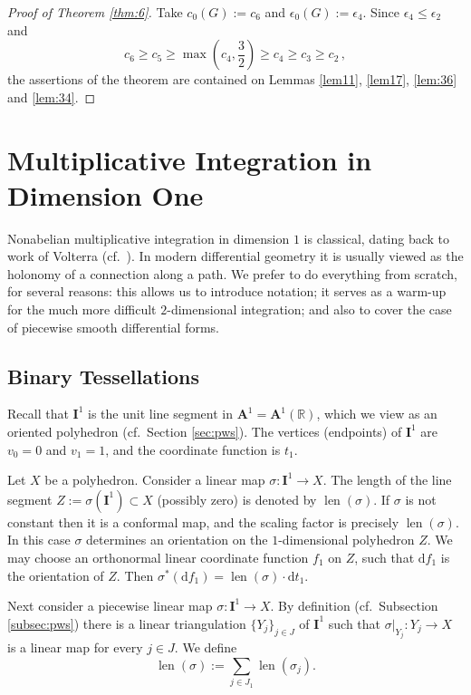 \documentclass[10pt, a4paper]{amsart}
\theoremstyle{definition}
\numberwithin{equation}{section}
\newcommand{\opn}{\operatorname}
\newcommand{\mbf}[1]{\mathbf{#1}}
\newcommand{\mrm}[1]{\mathrm{#1}}
\newcommand{\mbb}[1]{\mathbb{#1}}
\newcommand{\smfrac}[2]{{\textstyle \frac{#1}{#2}}}
\newcommand{\tup}[1]{\textup{#1}}
\newcommand{\R}{\mbb{R}}
\renewcommand{\d}{\mrm{d}}
\begin{document}
\begin{proof}[Proof of Theorem \tup{\ref{thm:6}}]
Take
$c_0(G) := c_6$ and $\epsilon_0(G) := \epsilon_4$.
Since $\epsilon_4 \leq \epsilon_2$ and
\[ c_6 \geq c_5 \geq \max( c_4, \smfrac{3}{2} ) 
\geq c_4 \geq c_3 \geq c_2 \, , \]
the assertions of the theorem 
are contained on Lemmas \ref{lem11}, \ref{lem17}, \ref{lem:36}
and \ref{lem:34}.  
\end{proof}








\cleardoublepage
\section{Multiplicative Integration in Dimension One}
\label{sec:dim1}

Nonabelian multiplicative integration in dimension $1$ is classical, dating back
to work of Volterra (cf.\ \cite{DF}).
In modern differential geometry it is
usually viewed as the holonomy of a connection along a path. We prefer
to do everything from scratch, for several reasons: this allows us to introduce
notation; it serves as a warm-up for the much more difficult
$2$-dimensional integration; and also to cover the case of piecewise smooth
differential forms. 

\subsection{Binary Tessellations}
Recall that $\mbf{I}^1$ is the unit line segment in 
$\mbf{A}^{1} = \mbf{A}^{1}(\R)$, which we view as an oriented
polyhedron (cf.\ Section \ref{sec:pws}). The vertices
(endpoints) of $\mbf{I}^1$ are $v_0 = 0$ and $v_1 = 1$, and the coordinate
function is $t_1$. 

Let $X$ be a polyhedron. 
Consider a linear map $\sigma : \mbf{I}^{1} \to X$.
The length of the line segment $Z := \sigma(\mbf{I}^{1}) \subset X$
(possibly zero) is denoted
by $\opn{len}(\sigma)$. If  $\sigma$ is not constant then it is a conformal map,
and the scaling factor is precisely $\opn{len}(\sigma)$. In this case $\sigma$ 
determines an orientation on the $1$-dimensional polyhedron $Z$. We may choose
an orthonormal linear coordinate
function $f_1$ on $Z$, such that $\d f_1$ is the orientation of $Z$. Then 
$\sigma^*(\d f_1) = \opn{len}(\sigma) \cdot \d t_1$.

Next consider a piecewise linear map $\sigma : \mbf{I}^{1} \to X$.
By definition (cf.\ Subsection \ref{subsec:pws})
there is a linear triangulation $\{ Y_j \}_{j \in J}$ of $\mbf{I}^{1}$ such
that 
$\sigma|_{Y_j} : Y_j \to X$ 
is a linear map for every $j \in J$. We define
\[ \opn{len}(\sigma) := \sum_{j \in J_1} \opn{len}(\sigma_j) . \]
\end{document}
